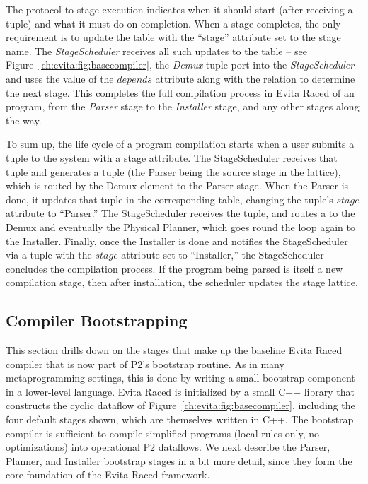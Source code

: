 The protocol to stage execution indicates when it should start (after receiving
a  tuple) and what it must do on completion.  When a
stage completes, the only requirement is to update the  table with
the ``stage'' attribute set to the stage name.  The {\em StageScheduler}
receives all such updates to the  table -- see
Figure~\ref{ch:evita:fig:basecompiler}, the {\em Demux}  tuple port
into the {\em StageScheduler} -- and uses the value of the 
$depends$ attribute along with the  relation to determine the
next stage.  This completes the full compilation process in Evita Raced of an
\OVERLOG program, from the {\em Parser} stage to the {\em Installer} stage, and
any other stages along the way.

To sum up, the life cycle of a program compilation starts when a user submits a
 tuple to the system with a  stage attribute.  The
StageScheduler receives that  tuple and generates a
 tuple (the Parser being the source stage in the
lattice), which is routed by the Demux element to the Parser stage.  When the
Parser is done, it updates that  tuple in the corresponding table,
changing the tuple's $stage$ attribute to ``Parser.'' The StageScheduler
receives the  tuple, and routes a  to the
Demux and eventually the Physical Planner, which goes round the loop again to
the Installer.  Finally, once the Installer is done and notifies the
StageScheduler via a  tuple with the $stage$ attribute set to
``Installer,'' the StageScheduler concludes the compilation process.  If the
\OVERLOG program being parsed is itself a new compilation stage, then after
installation, the scheduler updates the stage lattice.


\subsection{Compiler Bootstrapping}
\label{ch:evita:sec:bootstrap}

This section drills down on the stages that make up the baseline Evita Raced
compiler that is now part of P2's bootstrap routine.  As in many
metaprogramming settings, this is done by writing a small bootstrap component
in a lower-level language.  Evita Raced is initialized by a small C++ library
that constructs the cyclic dataflow of Figure~\ref{ch:evita:fig:basecompiler},
including the four default stages shown, which are themselves written in C++.
The bootstrap compiler is sufficient to compile simplified \OVERLOG programs
(local rules only, no optimizations) into operational P2 dataflows.  We next
describe the Parser, Planner, and Installer bootstrap stages in a bit more
detail, since they form the core foundation of the Evita Raced framework.

